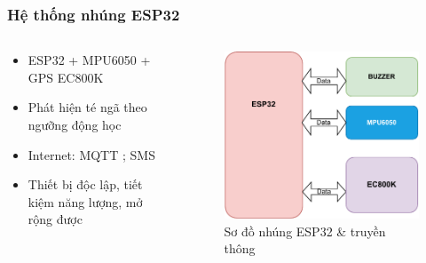 \begin{frame}
    \frametitle{Hệ thống nhúng ESP32}
    \begin{columns}[T]
        \begin{column}{0.48\textwidth}
            \begin{itemize}
                \item ESP32 + MPU6050 + GPS EC800K
                \item Phát hiện té ngã theo ngưỡng động học
                \item Internet: MQTT ; SMS 
                \item Thiết bị độc lập, tiết kiệm năng lượng, mở rộng được
            \end{itemize}
        \end{column}
        \begin{column}{0.48\textwidth}
            \begin{figure}
                \centering
                \includegraphics[width=\textwidth]{images/module1_block_diagram-crop.pdf}
                \caption{Sơ đồ nhúng ESP32 \& truyền thông}
            \end{figure}
        \end{column}
    \end{columns}
\end{frame}

